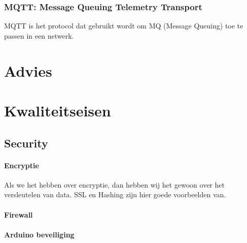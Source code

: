 \documentclass{article}
\begin{document}
\subsubsection{MQTT: Message Queuing Telemetry Transport}
MQTT is het protocol dat gebruikt wordt om MQ (Message Queuing) toe te passen in een netwerk.




\section{Advies}


\section{Kwaliteitseisen}


\subsection{Security}

\paragraph{Encryptie}
Als we het hebben over encryptie,
dan hebben wij het gewoon over het versleutelen van data.
SSL en Hashing zijn hier goede voorbeelden van.


\paragraph{Firewall}
\paragraph{Arduino beveiliging}
\end{document}
